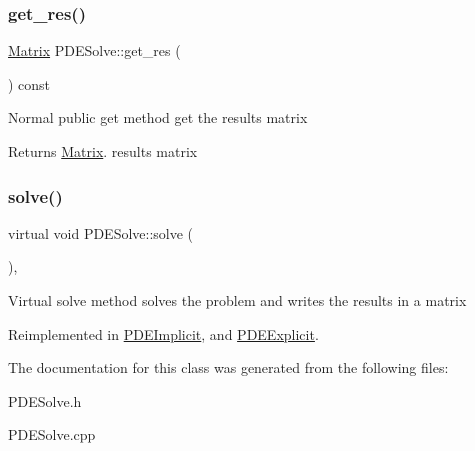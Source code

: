 \subsubsection{\texorpdfstring{get\+\_\+res()}{get\_res()}}
{\footnotesize\ttfamily \hyperlink{class_matrix}{Matrix} P\+D\+E\+Solve\+::get\+\_\+res (\begin{DoxyParamCaption}{ }\end{DoxyParamCaption}) const}

Normal public get method get the results matrix \begin{DoxyReturn}{Returns}
\hyperlink{class_matrix}{Matrix}. results matrix 
\end{DoxyReturn}
\mbox{\label{class_p_d_e_solve_a2fb309c3e7f35de2f639596f7fcb17cc}} 
\subsubsection{\texorpdfstring{solve()}{solve()}}
{\footnotesize\ttfamily virtual void P\+D\+E\+Solve\+::solve (\begin{DoxyParamCaption}{ }\end{DoxyParamCaption})\hspace{0.3cm}{\ttfamily [inline]}, {\ttfamily [virtual]}}

Virtual solve method solves the problem and writes the results in a matrix 

Reimplemented in \hyperlink{class_p_d_e_implicit_ace06b1a56c2766ca8d4bc95669d21d12}{P\+D\+E\+Implicit}, and \hyperlink{class_p_d_e_explicit_a78282717c8230e9be65599865865e0c7}{P\+D\+E\+Explicit}.



The documentation for this class was generated from the following files\+:\begin{DoxyCompactItemize}
\item 
P\+D\+E\+Solve.\+h\item 
P\+D\+E\+Solve.\+cpp\end{DoxyCompactItemize}

